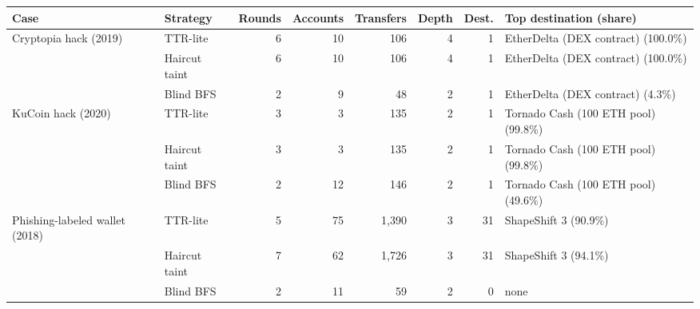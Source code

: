 \begin{tabular}{p{2.6cm} p{1.9cm} r r r r r p{4.4cm}}\toprule
\textbf{Case} & \textbf{Strategy} & \textbf{Rounds} & \textbf{Accounts} & \textbf{Transfers} & \textbf{Depth} & \textbf{Dest.} & \textbf{Top destination (share)}\\\midrule
Cryptopia hack (2019) & TTR-lite & 6 & 10 & 106 & 4 & 1 & EtherDelta (DEX contract) (100.0\%)\\
 & Haircut taint & 6 & 10 & 106 & 4 & 1 & EtherDelta (DEX contract) (100.0\%)\\
 & Blind BFS & 2 & 9 & 48 & 2 & 1 & EtherDelta (DEX contract) (4.3\%)\\
\midrule
KuCoin hack (2020) & TTR-lite & 3 & 3 & 135 & 2 & 1 & Tornado Cash (100 ETH pool) (99.8\%)\\
 & Haircut taint & 3 & 3 & 135 & 2 & 1 & Tornado Cash (100 ETH pool) (99.8\%)\\
 & Blind BFS & 2 & 12 & 146 & 2 & 1 & Tornado Cash (100 ETH pool) (49.6\%)\\
\midrule
Phishing-labeled wallet (2018) & TTR-lite & 5 & 75 & 1,390 & 3 & 31 & ShapeShift 3 (90.9\%)\\
 & Haircut taint & 7 & 62 & 1,726 & 3 & 31 & ShapeShift 3 (94.1\%)\\
 & Blind BFS & 2 & 11 & 59 & 2 & 0 & none\\
\bottomrule\end{tabular}
